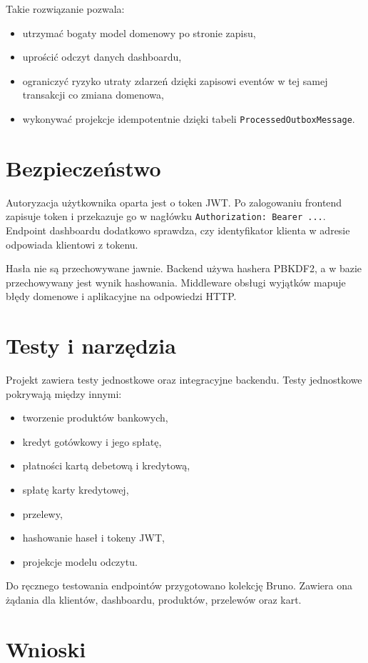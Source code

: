\documentclass[12pt,a4paper]{article}
\begin{document}
Takie rozwiązanie pozwala:
\begin{itemize}
\item utrzymać bogaty model domenowy po stronie zapisu,
\item uprościć odczyt danych dashboardu,
\item ograniczyć ryzyko utraty zdarzeń dzięki zapisowi eventów w tej samej transakcji co zmiana domenowa,
\item wykonywać projekcje idempotentnie dzięki tabeli \texttt{ProcessedOutboxMessage}.
\end{itemize}

\section{Bezpieczeństwo}

Autoryzacja użytkownika oparta jest o token JWT. Po zalogowaniu frontend zapisuje token i przekazuje go w nagłówku \texttt{Authorization: Bearer ...}. Endpoint dashboardu dodatkowo sprawdza, czy identyfikator klienta w adresie odpowiada klientowi z tokenu.

Hasła nie są przechowywane jawnie. Backend używa hashera PBKDF2, a w bazie przechowywany jest wynik hashowania. Middleware obsługi wyjątków mapuje błędy domenowe i aplikacyjne na odpowiedzi HTTP.

\section{Testy i narzędzia}

Projekt zawiera testy jednostkowe oraz integracyjne backendu. Testy jednostkowe pokrywają między innymi:
\begin{itemize}
\item tworzenie produktów bankowych,
\item kredyt gotówkowy i jego spłatę,
\item płatności kartą debetową i kredytową,
\item spłatę karty kredytowej,
\item przelewy,
\item hashowanie haseł i tokeny JWT,
\item projekcje modelu odczytu.
\end{itemize}

Do ręcznego testowania endpointów przygotowano kolekcję Bruno. Zawiera ona żądania dla klientów, dashboardu, produktów, przelewów oraz kart.

\section{Wnioski}
\end{document}
